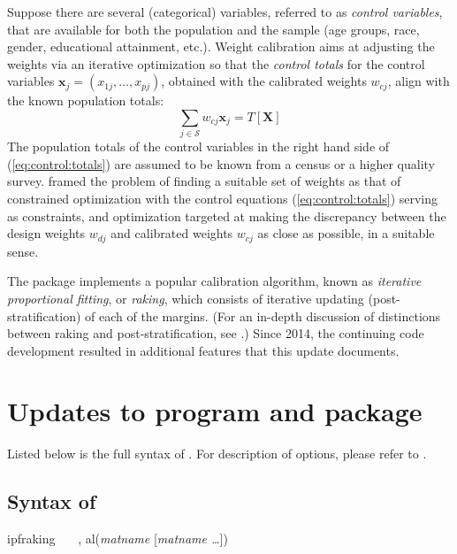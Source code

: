 Suppose there are several (categorical) variables, referred to
as {\it control variables}, that are available for both
the population and the sample
(age groups, race, gender, educational attainment, etc.).
Weight calibration aims at adjusting the weights
via an iterative optimization
so that the {\it control totals} for the control variables
$\mathbf{x}_j=(x_{1j}, \ldots, x_{pj})$, obtained with the calibrated
weights $w_{cj}$, align with the known population totals:
\begin{equation}
    \sum_{j \in \mathcal{S}} w_{cj} \mathbf{x}_j
    = T [ \mathbf{X}  ]
    \label{eq:control:totals}
\end{equation}
The population totals of the control variables in the right hand side
of (\ref{eq:control:totals}) are assumed to be known from a census or a higher quality survey.
\citet{deville:sarndal:1992} framed the problem of finding a suitable
set of weights as that of constrained optimization with the control
equations (\ref{eq:control:totals}) serving as constraints,
and optimization targeted at making the discrepancy between
the design weights $w_{dj}$ and calibrated weights
$w_{cj}$ as close as possible, in a suitable sense.

The package  \citep{kolenikov:2014} implements
a popular calibration algorithm, known as \textit{iterative proportional fitting},
or \textit{raking}, which consists of iterative updating (post-stratification) of
each of the margins. (For an in-depth discussion of distinctions between
raking and post-stratification, see \citet{kolenikov:2016}.)
Since 2014, the continuing code development resulted
in additional features that this update documents.


\section{Updates to  program and package}

Listed below is the full syntax of . For description of options,
please refer to \citet{kolenikov:2014}.

\subsection{Syntax of }
\label{subsec:syntax}

\begin{stsyntax}
ipfraking
\optif\
\optin\
\optweight\
,
al({\it matname} [{\it matname \ldots}])
\end{stsyntax}

